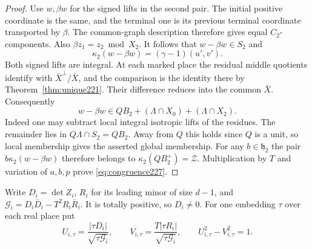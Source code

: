 \documentclass[a4paper,11pt]{article}
\theoremstyle{definition}
\theoremstyle{remark}
\numberwithin{equation}{section}
\begin{document}
\begin{proof}
Use \(w,\beta w\) for the signed lifts in the second pair.
The initial positive coordinate is the same, and the terminal
one is its previous terminal coordinate transported by \(\beta\).
The common-graph description therefore gives equal
\(C_2\)-components. Also \(\beta z_1=z_2\bmod X_2\). It follows
that \(w-\beta w\in S_2\) and
\[
              \kappa_2(w-\beta w)=(\gamma-1)(u',v').
\]
Both signed lifts are integral. At each marked place the
residual middle quotients identify with
\(\bar X^\perp/\bar X\), and the comparison is the identity
there by Theorem~\ref{thm:unique221}. Their difference reduces
into the common \(\bar X\). Consequently
\[
 w-\beta w\in QB_2+(\Lambda\cap X_0)+(\Lambda\cap X_2).
\]
Indeed one may subtract local integral isotropic lifts of the
residues. The remainder lies in \(Q\Lambda\cap S_2=QB_2\).
Away from \(Q\) this holds since \(Q\) is a unit, so local
membership gives the asserted global membership. For any
\(b\in\mathfrak h_2\) the pair \(b\kappa_2(w-\beta w)\)
therefore belongs to \(\kappa_2(QB_2^+)=\mathcal Z\).
Multiplication by \(T\) and variation of \(a,b,p\) prove
\eqref{eq:congruence227}.
\end{proof}

Write \(D_i=\det Z_i\), \(R_i\) for its leading minor of
size \(d-1\), and \(\mathcal G_i=D_i\bar D_i-T^2R_i\bar R_i\).
It is totally positive, so \(D_i\ne0\). For one embedding
\(\tau\) over each real place put
\[
 U_{i,\tau}=\frac{|\tau D_i|}{\sqrt{\tau\mathcal G_i}},
 \qquad V_{i,\tau}=\frac{T|\tau R_i|}{\sqrt{\tau\mathcal G_i}},
 \qquad U_{i,\tau}^2-V_{i,\tau}^2=1 .
\]
\end{document}
